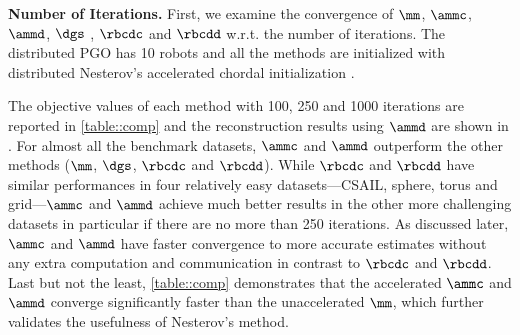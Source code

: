 



\textbf{Number of Iterations.} First, we examine the convergence of $\mm$, $\ammc$, $\ammd$, $\dgs$ \cite{choudhary2017distributed}, $\rbcdc$ \cite{tian2019distributed}  and $\rbcdd$ \cite{tian2019distributed} w.r.t. the number of iterations. The distributed PGO has 10 robots and all the methods are initialized with distributed Nesterov's accelerated chordal initialization \cite{fan2020mm}.

The objective values of each method with 100, 250 and 1000 iterations are reported in \cref{table::comp} and the reconstruction results using $\ammd$ are shown in . For almost all the benchmark datasets, $\ammc$ and $\ammd$ outperform the other methods ($\mm$, $\dgs$, $\rbcdc$ and $\rbcdd$). While $\rbcdc$ and $\rbcdd$ have similar performances in four relatively  easy datasets---{\sf CSAIL}, {\sf sphere}, {\sf torus} and {\sf grid}---$\ammc$ and $\ammd$ achieve much better results in the other more challenging datasets in particular if there are no more than 250 iterations. As discussed later, $\ammc$ and $\ammd$ have faster convergence to more accurate estimates without any extra computation and communication in contrast to $\rbcdc$ and $\rbcdd$. Last but not the least, \cref{table::comp} demonstrates that the accelerated $\ammc$ and $\ammd$ converge significantly faster than the unaccelerated $\mm$, which further validates the usefulness of Nesterov's method.

\figbenchmark



